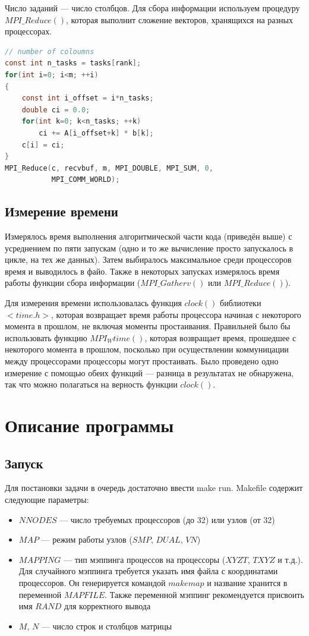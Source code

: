 \documentclass[14pt]{extarticle}
\begin{document}
Число заданий --- число столбцов. Для сбора информации используем процедуру $MPI\_Reduce()$, которая выполнит сложение векторов, хранящихся на разных процессорах.

\begin{lstlisting}[language=C]
// number of coloumns
const int n_tasks = tasks[rank];
for(int i=0; i<m; ++i)
{
    const int i_offset = i*n_tasks;
    double ci = 0.0;
    for(int k=0; k<n_tasks; ++k)
        ci += A[i_offset+k] * b[k];
    c[i] = ci;
}
MPI_Reduce(c, recvbuf, m, MPI_DOUBLE, MPI_SUM, 0,
           MPI_COMM_WORLD);
\end{lstlisting}

\subsection{Измерение времени}
Измерялось время выполнения алгоритмической части кода (приведён выше) с усреднением по пяти запускам (одно и то же вычисление просто запускалось в цикле, на тех же данных). Затем выбиралось максимальное среди процессоров время и выводилось в файо. Также в некоторых запусках измерялось время работы функции сбора информации ($MPI\_Gatherv()$ или $MPI\_Reduce()$).

Для измерения времени использовалась функция $clock()$ библиотеки $<time.h>$, которая возвращает время работы процессора начиная с некоторого момента в прошлом, не включая моменты простаивания. Правильней было бы использовать функцию $MPI_Wtime()$, которая возвращает время, прошедшее с некоторого момента в прошлом, посколько при осуществлении коммуницации между процессорами процессоры могут простаивать. Было проведено одно измерение с помощью обеих функций --- разница в результатах не обнаружена, так что можно полагаться на верность функции $clock()$.

\section{Описание программы}
\subsection{Запуск}
Для постановки задачи в очередь достаточно ввести make run. Makefile содержит следующие параметры:
\begin{itemize}
\item $NNODES$ --- число требуемых процессоров (до 32) или узлов (от 32)
\item $MAP$ --- режим работы узлов ($SMP$, $DUAL$, $VN$)
\item $MAPPING$ --- тип мэппинга процессов на процессоры ($XYZT$, $TXYZ$ и т.д.). Для случайного мэппинга требуется указать имя файла с координатами процессоров. Он генерируется командой $make map$ и название хранится в переменной $MAPFILE$. Также переменной мэппинг рекомендуется присвоить имя $RAND$ для корректного вывода
\item $M$, $N$ --- число строк и столбцов матрицы
\end{itemize}
\end{document}
